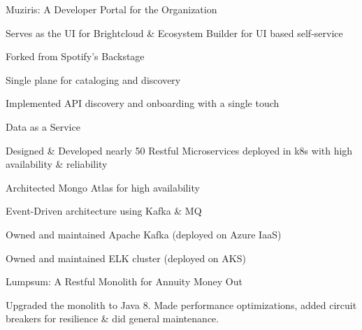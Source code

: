 \documentclass[]{de-resume}
\begin{document}
\begin{minipage}[t]{0.66\textwidth}
\begin{tightemize}
\item Muziris: A Developer Portal for the Organization
\begin{tightemize}
	\sectionsep
	\item Serves as the UI for Brightcloud \& Ecosystem Builder for UI based self-service
	\item Forked from Spotify's Backstage
	\item Single plane for cataloging and discovery 
	\item Implemented API discovery and onboarding with a single touch
	\sectionsep
\end{tightemize}

\end{tightemize}
\sectionsep
{}
\begin{tightemize}
\item Data as a Service
	\sectionsep
	\begin{tightemize}
	\item Designed \& Developed nearly 50 Restful Microservices deployed in k8s with high availability \& reliability
	\item Architected Mongo Atlas for high availability 
	\item Event-Driven architecture using Kafka \& MQ
	\item Owned and maintained Apache Kafka (deployed on Azure IaaS)
	\item Owned and maintained ELK cluster (deployed on AKS)
	\end{tightemize}
	\sectionsep
\end{tightemize}
\subsectionsep


\subsectionsep
{}
\subsectionsep
\begin{tightemize}
\item Lumpsum: A Restful Monolith for Annuity Money Out
	\begin{tightemize}
		\sectionsep
		\item Upgraded the monolith to Java 8. Made performance optimizations, added circuit breakers for resilience \& did general maintenance.
		\sectionsep
	\end{tightemize}
\end{tightemize}



\end{minipage}
\end{document}
